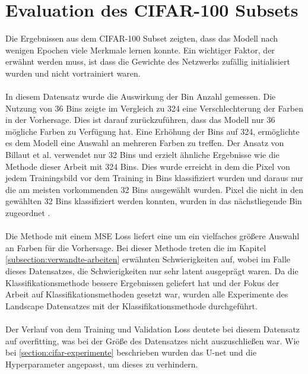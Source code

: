 \section{Evaluation des CIFAR-100 Subsets}
Die Ergebnissen aus dem CIFAR-100 Subset zeigten, dass das Modell nach wenigen Epochen viele Merkmale lernen konnte. Ein wichtiger Faktor, der
erwähnt werden muss, ist dass die Gewichte des Netzwerks zufällig initialisiert wurden und nicht vortrainiert waren.
\\
\\
In diesem Datensatz wurde die Auswirkung der Bin Anzahl gemessen. Die Nutzung von 36 Bins zeigte im Vergleich zu 324 eine
Verschlechterung der Farben in der Vorhersage. Dies ist darauf zurückzuführen, dass das Modell nur 36 mögliche Farben zu Verfügung hat.
Eine Erhöhung der Bins auf 324, ermöglichte es dem Modell eine Auswahl an mehreren Farben zu treffen.
Der Ansatz von Billaut et al. verwendet nur 32 Bins und erzielt ähnliche Ergebnisse wie die Methode dieser Arbeit mit 324 Bins.
Dies wurde erreicht in dem die Pixel von jedem Trainingsbild vor dem Training in Bins klassifiziert wurden und daraus nur die am meisten
vorkommenden 32 Bins ausgewählt wurden. Pixel die nicht in den gewählten 32 Bins klassifiziert werden konnten, wurden in das nächstliegende Bin
zugeordnet \cite{billaut2018colorunet}.
\\
\\
Die Methode mit einem MSE Loss liefert eine um ein vielfaches größere Auswahl an Farben für die Vorhersage. Bei dieser Methode treten
die im Kapitel \ref{subsection:verwandte-arbeiten} erwähnten Schwierigkeiten auf, wobei im Falle dieses Datensatzes, die Schwierigkeiten
nur sehr latent ausgeprägt waren.
Da die Klassifikationsmethode bessere Ergebnissen geliefert hat und der Fokus der Arbeit auf Klassifikationsmethoden gesetzt war,
wurden alle Experimente des Landscape Datensatzes mit der Klassifikationsmethode durchgeführt.
\\
\\
Der Verlauf von dem Training und Validation Loss deutete bei diesem Datensatz auf \gls{overfitting}, was bei der Größe des Datensatzes nicht auszuschließen war.
Wie bei \ref{section:cifar-experimente} beschrieben wurden das U-net und die Hyperparameter angepasst, um dieses zu verhindern.

